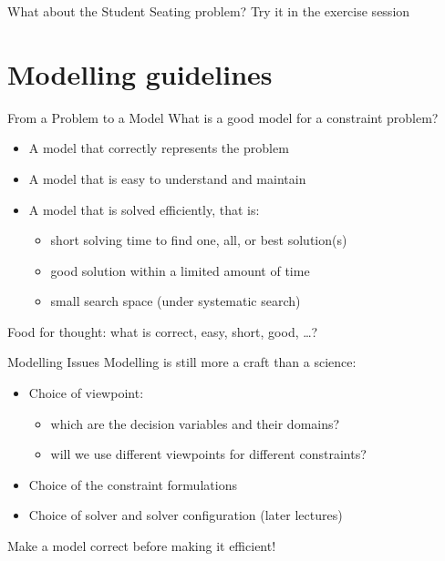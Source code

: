 \documentclass{cons-beamer}
\begin{document}
\begin{frame}{What about the Student Seating problem?}
\vfill
\alert{Try it in the exercise session}
\vfill
\end{frame}

\section{Modelling guidelines}

\begin{frame}{From a Problem to a Model}
What is a good model for a constraint problem? \vfill
\begin{itemize}
  \item A model that \alert{correctly} represents the problem \vfill
  \item A model that is \alert{easy} to understand and maintain \vfill
  \item A model that is solved \alert{efficiently}, that is: \vfill
    \begin{itemize}
      \item \alert{short} solving time to find one, all, or best
        solution(s) \vfill
      \item \alert{good} solution within a limited amount of time \vfill
      \item \alert{small} search space (under systematic search)
    \end{itemize}
\end{itemize}\vfill

Food for thought: what is \alert{correct}, \alert{easy},
\alert{short}, \alert{good}, \dots?
\end{frame}

\begin{frame}{Modelling Issues}
Modelling is still more a craft than a science: \vfill
\begin{itemize}
  \item Choice of viewpoint:
    \begin{itemize}
      \item which are the decision variables and their domains? \vfill
      \item will we use different viewpoints for different constraints? \vfill
    \end{itemize}
  \item Choice of the constraint formulations \vfill
  \item Choice of solver and solver configuration (later lectures)
\end{itemize}\vfill

\alert{Make a model correct before making it efficient!}
\end{frame}
\end{document}
